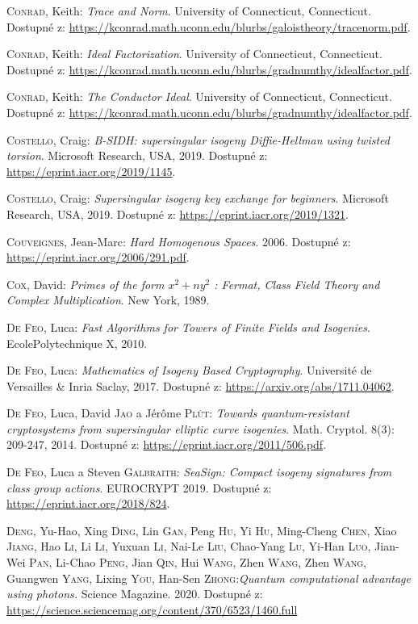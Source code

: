 \documentclass[12pt]{report}
\begin{document}
\begin{thebibliography}{97}
\textsc{Conrad}, Keith: \textit{Trace and Norm}. University of Connecticut, Connecticut. Dostupné z: \url{https://kconrad.math.uconn.edu/blurbs/galoistheory/tracenorm.pdf}.

\textsc{Conrad}, Keith: \textit{Ideal Factorization}. University of Connecticut, Connecticut. Dostupné z: \url{https://kconrad.math.uconn.edu/blurbs/gradnumthy/idealfactor.pdf}.

\textsc{Conrad}, Keith: \textit{The Conductor Ideal}. University of Connecticut, Connecticut. Dostupné z: \url{https://kconrad.math.uconn.edu/blurbs/gradnumthy/idealfactor.pdf}.

\textsc{Costello}, Craig: \textit{B-SIDH: supersingular isogeny Diffie-Hellman using twisted torsion}. Microsoft Research, USA, 2019. Dostupné z: \url{https://eprint.iacr.org/2019/1145}.

\textsc{Costello}, Craig: \textit{Supersingular isogeny key exchange for beginners}. Microsoft Research, USA, 2019. Dostupné z: \url{https://eprint.iacr.org/2019/1321}.


\textsc{Couveignes}, Jean-Marc: \textit{Hard Homogenous Spaces}. 2006. Dostupné z: \url{https://eprint.iacr.org/2006/291.pdf}.

\textsc{Cox}, David: \textit{Primes of the form $x^2+n y^2$ : Fermat, Class Field Theory and Complex Multiplication}. New York, 1989.

\textsc{De Feo}, Luca: \textit{Fast Algorithms for Towers of Finite Fields and Isogenies}. EcolePolytechnique X, 2010. 

\textsc{De Feo}, Luca: \textit{Mathematics of Isogeny Based Cryptography}. Université de Versailles \& Inria Saclay, 2017. Dostupné z: \url{https://arxiv.org/abs/1711.04062}.

\textsc{De Feo}, Luca, David \textsc{Jao} a Jérôme \textsc{Plût}: \textit{Towards quantum-resistant cryptosystems from supersingular elliptic curve isogenies}. Math. Cryptol. 8(3): 209-247, 2014. Dostupné z: \url{https://eprint.iacr.org/2011/506.pdf}.

\textsc{De Feo}, Luca a Steven \textsc{Galbraith}: \textit{SeaSign: Compact isogeny signatures from class group actions}. EUROCRYPT 2019. Dostupné z: \url{https://eprint.iacr.org/2018/824}.

\textsc{Deng}, Yu-Hao, Xing \textsc{Ding}, Lin \textsc{Gan}, Peng \textsc{Hu}, Yi \textsc{Hu}, Ming-Cheng \textsc{Chen}, Xiao \textsc{Jiang}, Hao \textsc{Li}, Li \textsc{Li}, Yuxuan \textsc{Li}, Nai-Le \textsc{Liu}, Chao-Yang \textsc{Lu}, Yi-Han \textsc{Luo}, Jian-Wei \textsc{Pan}, Li-Chao \textsc{Peng}, Jian \textsc{Qin}, Hui \textsc{Wang}, Zhen \textsc{Wang}, Zhen \textsc{Wang}, Guangwen \textsc{Yang}, Lixing \textsc{You}, Han-Sen \textsc{Zhong}:\textit{Quantum computational advantage using photons.} Science Magazine. 2020. Dostupné z: \url{https://science.sciencemag.org/content/370/6523/1460.full}


\end{thebibliography}
\end{document}
